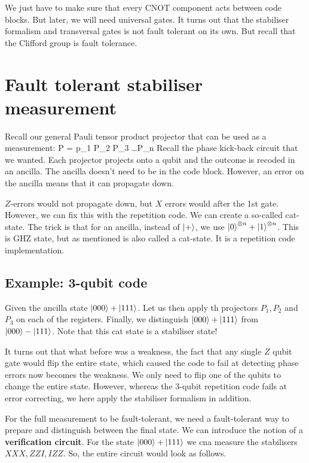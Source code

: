 We just have to make sure that every CNOT component acts between code blocks. But later, we will need universal gates. It turns out that the stabiliser formalism and transversal gates is not fault tolerant on its own. But recall that the Clifford group is fault tolerance. 

\section{Fault tolerant stabiliser measurement}
Recall our general Pauli tensor product projector that can be used as a measurement:
\beq
P = p_1 \otimes P_2 \otimes P_3 \ldots P_n
\eeq
Recall the phase kick-back circuit that we wanted. Each projector projects onto a qubit and the outcome is recoded in an ancilla. The ancilla doesn't need to be in the code block. However, an error on the ancilla means that it can propagate down. 

$Z$-errors would not propagate down, but $X$ errors would after the 1st gate. However, we can fix this with the repetition code. We can create a so-called cat-state. The trick is that for an ancilla, instead of $\ket{+}$, we use $\ket{0}^{\otimes n} + \ket{1} ^{\otimes n}$. This is GHZ state, but as mentioned is also called a cat-state. It is a repetition code implementation. 

\subsection{Example: 3-qubit code}
Given the ancilla state $\ket{000} + \ket{111}$. Let us then apply th projectors $P_1, P_2$ and $P_3$ on each of the registers. Finally, we distinguish $\ket{000} + \ket{111}$ from $\ket{000} - \ket{111}$. Note that this cat state is a stabiliser state! 

It turns out that what before was a weakness, the fact that any single $Z$ qubit gate would flip the entire state, which caused the code to fail at detecting phase errors now becomes the weakness. We only need to flip one of the qubits to change the entire state. However, whereas the 3-qubit repetition code fails at error correcting, we here apply the stabiliser formalism in addition. 

For the full measurement to be fault-tolerant, we need a fault-tolerant way to prepare and distinguish between the final state. We can introduce the notion of a \textbf{verification circuit}. For the state $\ket{000} + \ket{111}$ we cna measure the stabilisers $XXX, ZZI, IZZ$. So, the entire circuit would look as follows. 

